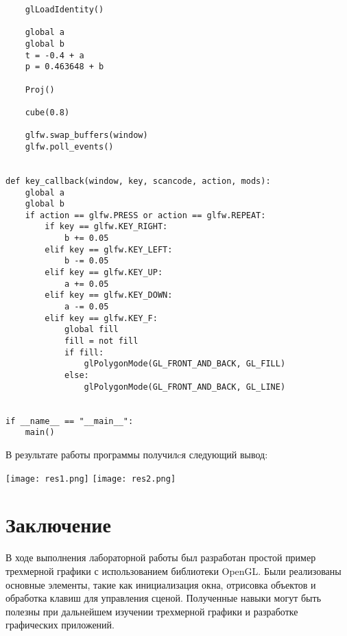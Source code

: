 \documentclass[a4paper, 14pt]{extarticle}
\begin{document}
\begin{lstlisting}
    glLoadIdentity()

    global a
    global b
    t = -0.4 + a
    p = 0.463648 + b

    Proj()

    cube(0.8)

    glfw.swap_buffers(window)
    glfw.poll_events()


def key_callback(window, key, scancode, action, mods):
    global a
    global b
    if action == glfw.PRESS or action == glfw.REPEAT:
        if key == glfw.KEY_RIGHT:
            b += 0.05
        elif key == glfw.KEY_LEFT:
            b -= 0.05
        elif key == glfw.KEY_UP:
            a += 0.05
        elif key == glfw.KEY_DOWN:
            a -= 0.05
        elif key == glfw.KEY_F:
            global fill
            fill = not fill
            if fill:
                glPolygonMode(GL_FRONT_AND_BACK, GL_FILL)
            else:
                glPolygonMode(GL_FRONT_AND_BACK, GL_LINE)


if __name__ == "__main__":
    main()

\end{lstlisting}
В результате работы программы получилcя следующий вывод:
\begin{center}
    \texttt{[image: res1.png]}
    \newpage
    \texttt{[image: res2.png]}
\end{center}
\pagebreak

\section{Заключение}
В ходе выполнения лабораторной работы был разработан простой пример трехмерной графики с использованием библиотеки OpenGL. Были реализованы основные элементы, такие как инициализация окна, отрисовка объектов и обработка клавиш для управления сценой. Полученные навыки могут быть полезны при дальнейшем изучении трехмерной графики и разработке графических приложений.
\end{document}
